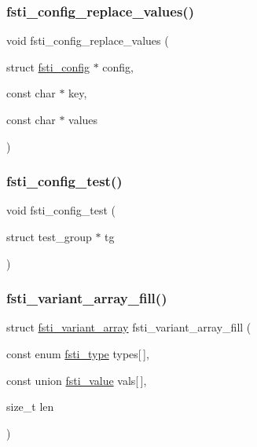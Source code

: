 \subsubsection{\texorpdfstring{fsti\+\_\+config\+\_\+replace\+\_\+values()}{fsti\_config\_replace\_values()}}
{\footnotesize\ttfamily void fsti\+\_\+config\+\_\+replace\+\_\+values (\begin{DoxyParamCaption}\item[{struct \mbox{\hyperlink{structfsti__config}{fsti\+\_\+config}} $\ast$}]{config,  }\item[{const char $\ast$}]{key,  }\item[{const char $\ast$}]{values }\end{DoxyParamCaption})}

\mbox{\label{fsti-config_8c_a56851785b4dd54466e2d92ef3d55fc2f}} 
\subsubsection{\texorpdfstring{fsti\+\_\+config\+\_\+test()}{fsti\_config\_test()}}
{\footnotesize\ttfamily void fsti\+\_\+config\+\_\+test (\begin{DoxyParamCaption}\item[{struct test\+\_\+group $\ast$}]{tg }\end{DoxyParamCaption})}

\mbox{\label{fsti-config_8c_a58182343b78c10550b55c54b4c61ea20}} 
\subsubsection{\texorpdfstring{fsti\+\_\+variant\+\_\+array\+\_\+fill()}{fsti\_variant\_array\_fill()}}
{\footnotesize\ttfamily struct \mbox{\hyperlink{structfsti__variant__array}{fsti\+\_\+variant\+\_\+array}} fsti\+\_\+variant\+\_\+array\+\_\+fill (\begin{DoxyParamCaption}\item[{const enum \mbox{\hyperlink{fsti-defs_8h_ab12bd8dfbafbc55e2015aac7926007cf}{fsti\+\_\+type}}}]{types\mbox{[}$\,$\mbox{]},  }\item[{const union \mbox{\hyperlink{unionfsti__value}{fsti\+\_\+value}}}]{vals\mbox{[}$\,$\mbox{]},  }\item[{size\+\_\+t}]{len }\end{DoxyParamCaption})}

